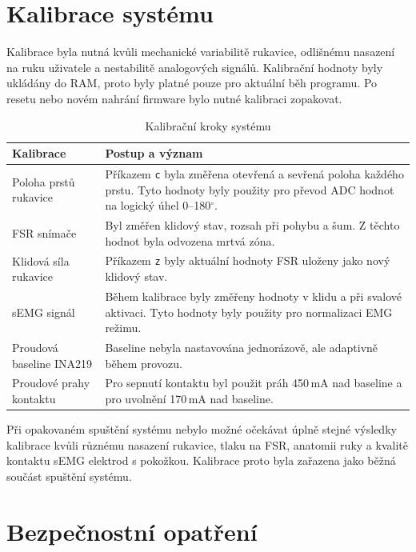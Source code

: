 \documentclass[FZS,DP]{tulthesis}
\begin{document}
\section{Kalibrace systému}
\label{sec:kalibrace-systemu-hardware}

Kalibrace byla nutná kvůli mechanické variabilitě rukavice, odlišnému nasazení na ruku uživatele a nestabilitě analogových signálů. Kalibrační hodnoty byly ukládány do RAM, proto byly platné pouze pro aktuální běh programu. Po resetu nebo novém nahrání firmware bylo nutné kalibraci zopakovat.

\begin{table}[H]
\centering
\caption{Kalibrační kroky systému}
\label{tab:kalibrace-systemu}
\begin{tabular}{|p{}|p{}|}
\hline
\textbf{Kalibrace} & \textbf{Postup a význam} \\
\hline
Poloha prstů rukavice & Příkazem \texttt{c} byla změřena otevřená a sevřená poloha každého prstu. Tyto hodnoty byly použity pro převod ADC hodnot na logický úhel 0--180$^\circ$. \\
\hline
FSR snímače & Byl změřen klidový stav, rozsah při pohybu a šum. Z těchto hodnot byla odvozena mrtvá zóna. \\
\hline
Klidová síla rukavice & Příkazem \texttt{z} byly aktuální hodnoty FSR uloženy jako nový klidový stav. \\
\hline
sEMG signál & Během kalibrace byly změřeny hodnoty v klidu a při svalové aktivaci. Tyto hodnoty byly použity pro normalizaci EMG režimu. \\
\hline
Proudová baseline INA219 & Baseline nebyla nastavována jednorázově, ale adaptivně během provozu. \\
\hline
Proudové prahy kontaktu & Pro sepnutí kontaktu byl použit práh 450\,mA nad baseline a pro uvolnění 170\,mA nad baseline. \\
\hline
\end{tabular}
\end{table}

Při opakovaném spuštění systému nebylo možné očekávat úplně stejné výsledky kalibrace kvůli různému nasazení rukavice, tlaku  na FSR, anatomii ruky a kvalitě kontaktu sEMG elektrod s pokožkou. Kalibrace proto byla zařazena jako běžná součást spuštění systému.

\section{Bezpečnostní opatření}
\label{sec:bezpecnostni-opatreni}
\end{document}
